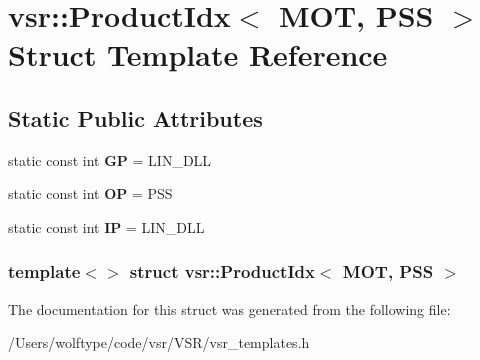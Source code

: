 \hypertarget{structvsr_1_1_product_idx_3_01_m_o_t_00_01_p_s_s_01_4}{\section{vsr\-:\-:Product\-Idx$<$ M\-O\-T, P\-S\-S $>$ Struct Template Reference}
\label{structvsr_1_1_product_idx_3_01_m_o_t_00_01_p_s_s_01_4}
}
\subsection*{Static Public Attributes}
\begin{DoxyCompactItemize}
\item 
\hypertarget{structvsr_1_1_product_idx_3_01_m_o_t_00_01_p_s_s_01_4_abd571d059274a5279f9ae78e24a260cb}{static const int {\bfseries G\-P} = L\-I\-N\-\_\-\-D\-L\-L}\label{structvsr_1_1_product_idx_3_01_m_o_t_00_01_p_s_s_01_4_abd571d059274a5279f9ae78e24a260cb}

\item 
\hypertarget{structvsr_1_1_product_idx_3_01_m_o_t_00_01_p_s_s_01_4_ad4ce762d649d9461e125dcc1c34bfc45}{static const int {\bfseries O\-P} = P\-S\-S}\label{structvsr_1_1_product_idx_3_01_m_o_t_00_01_p_s_s_01_4_ad4ce762d649d9461e125dcc1c34bfc45}

\item 
\hypertarget{structvsr_1_1_product_idx_3_01_m_o_t_00_01_p_s_s_01_4_a6fddbf70fc33026ee52b0dba16305f42}{static const int {\bfseries I\-P} = L\-I\-N\-\_\-\-D\-L\-L}\label{structvsr_1_1_product_idx_3_01_m_o_t_00_01_p_s_s_01_4_a6fddbf70fc33026ee52b0dba16305f42}

\end{DoxyCompactItemize}
\subsubsection*{template$<$$>$ struct vsr\-::\-Product\-Idx$<$ M\-O\-T, P\-S\-S $>$}



The documentation for this struct was generated from the following file\-:\begin{DoxyCompactItemize}
\item 
/\-Users/wolftype/code/vsr/\-V\-S\-R/vsr\-\_\-templates.\-h\end{DoxyCompactItemize}
